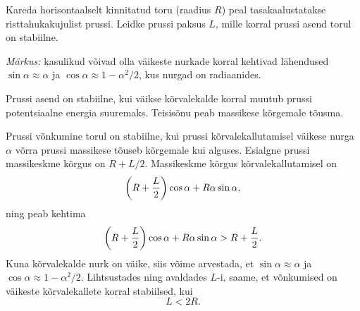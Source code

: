 
Kareda horisontaalselt kinnitatud toru (raadius $R$) peal tasakaalustatakse risttahukakujulist prussi. Leidke prussi paksus $L$, mille
korral prussi asend torul on stabiilne.

\emph{Märkus:} kasulikud võivad olla väikeste nurkade korral kehtivad lähendused
$\sin\alpha\approx \alpha$ ja $\cos\alpha\approx 1-\alpha^2/2$, kus nurgad on radiaanides.

\hint
Prussi asend on stabiilne, kui väikse kõrvalekalde korral muutub prussi potentsiaalne energia suuremaks. Teisisõnu peab massikese kõrgemale tõusma.

\solu
Prussi võnkumine torul on stabiilne, kui prussi
kõrvalekallutamisel väikese nurga $\alpha$ võrra prussi massikese
tõuseb kõrgemale kui alguses. Esialgne prussi massikeskme kõrgus on $R+L/2$.
Massikeskme kõrgus kõrvalekallutamisel on
\[\left(R+{L \over 2}\right)\cos\alpha+R\alpha\sin\alpha,\]
ning peab kehtima
\[\left(R+{L \over 2}\right)\cos\alpha+R\alpha\sin\alpha >R+{L \over 2}.\]
Kuna kõrvalekalde nurk on väike, siis võime arvestada, et
$\sin\alpha\approx \alpha$ ja $\cos\alpha\approx 1-\alpha^2/2$. Lihtsustades ning avaldades $L$-i, saame, et võnkumised on väikeste kõrvalekallete korral stabiilsed, kui
\[L<2R.\]
\probend